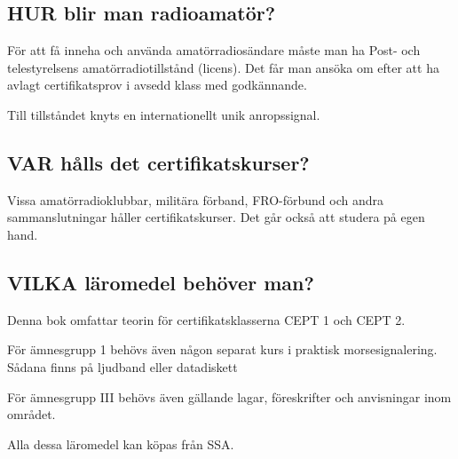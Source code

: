 \subsection*{HUR blir man radioamatör?}

\begin{rev-omarbetas}

För att få inneha och använda amatörradiosändare måste man ha Post- och telestyrelsens
amatörradiotillstånd (licens). Det får man ansöka om efter att ha avlagt certifikatsprov
i avsedd klass med godkännande.

Till tillståndet knyts en internationellt unik anropssignal.

\end{rev-omarbetas}

\subsection*{VAR hålls det certifikatskurser?}

Vissa amatörradioklubbar, militära förband,
FRO-förbund och andra sammanslutningar
håller certifikatskurser. Det går också att
studera på egen hand.

\subsection*{VILKA läromedel behöver man?}

\begin{rev-omarbetas}

Denna bok omfattar teorin för certifikatsklasserna CEPT 1 och CEPT 2.

För ämnesgrupp 1 behövs även någon separat kurs i praktisk morsesignalering.
Sådana finns på ljudband eller datadiskett

För ämnesgrupp III behövs även gällande lagar, föreskrifter och anvisningar inom
området.

Alla dessa läromedel kan köpas från SSA.

\end{rev-omarbetas}
